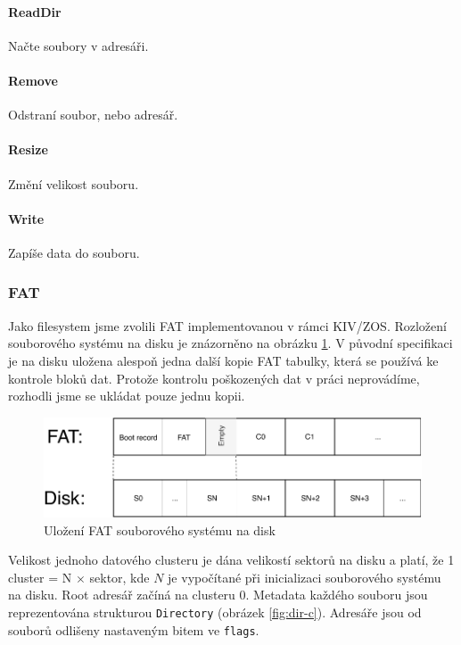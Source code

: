 \documentclass[11pt,a4paper]{scrartcl}
\begin{document}
	\paragraph{ReadDir}
	Načte soubory v adresáři.
	
	\paragraph{Remove}
	Odstraní soubor, nebo adresář.
	
	\paragraph{Resize}
	Změní velikost souboru.
	
	\paragraph{Write}
	Zapíše data do souboru.
	
	\subsubsection{FAT}
	
	Jako filesystem jsme zvolili FAT implementovanou v rámci KIV/ZOS. Rozložení souborového systému na disku je znázorněno na obrázku \ref{fig:fat-disk-struct}. V původní specifikaci je na disku uložena alespoň jedna další kopie FAT tabulky, která se používá ke kontrole bloků dat. Protože kontrolu poškozených dat v práci neprovádíme, rozhodli jsme se ukládat pouze jednu kopii.
	
	\begin{figure}[H]
		\centering
		\includegraphics[width=12cm]{fat-rozdeleni-disku.pdf}
		\caption{Uložení FAT souborového systému na disk}
		\label{fig:fat-disk-struct}
	\end{figure}

	Velikost jednoho datového clusteru je dána velikostí sektorů na disku a platí, že 1 cluster = N $\times$ sektor, kde $N$ je vypočítané při inicializaci souborového systému na disku. Root adresář začíná na clusteru 0. Metadata každého souboru jsou reprezentována strukturou \verb|Directory| (obrázek \ref{fig:dir-c}). Adresáře jsou od souborů odlišeny nastaveným bitem ve \verb|flags|.
	
\end{document}
